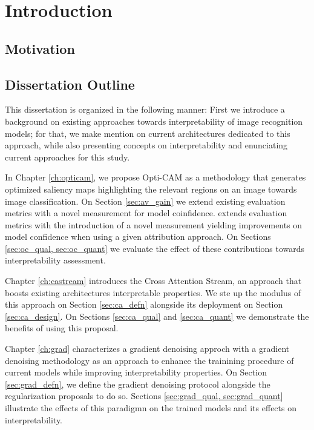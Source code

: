     \chapter*{Introduction}
    \chaptertoc{}

    \section*{Motivation}

    \section*{Dissertation Outline}
    This dissertation is organized in the following manner: First
    we introduce a background on existing approaches towards interpretability of image
    recognition models; for that, we make mention on current architectures dedicated 
    to this approach, while also presenting concepts on interpretability and enunciating 
    current approaches for this study. 

    In Chapter \ref{ch:opticam}, we propose Opti-CAM as a methodology that generates 
    optimized saliency maps highlighting the relevant regions on an image towards image
    classification. On Section \ref{sec:av_gain} we extend existing evaluation metrics 
    with a novel measurement for model coinfidence. extends evaluation metrics with the 
    introduction of a novel measurement yielding improvements on model confidence 
    when using a given attribution approach. On Sections \ref{sec:oc_qual, sec:oc_quant} 
    we evaluate the effect of these contributions towards interpretability assessment.
    
    Chapter \ref{ch:castream} introduces the Cross Attention Stream, an approach that boosts
     existing architectures interpretable properties. We ste up the modulus of this approach 
    on Section \ref{sec:ca_defn} alongside its deployment on Section \ref{sec:ca_design}. 
    On Sections \ref{sec:ca_qual} and \ref{sec:ca_quant} we demonstrate the benefits 
    of using this proposal.
    
    Chapter \ref{ch:grad} characterizes a gradient denoising approch with a gradient denoising
     methodology as an approach to enhance the trainining procedure of current
    models while improving interpretability properties. On Section \ref{sec:grad_defn}, 
    we define the gradient denoising protocol alongside the regularization proposals to do so.
    Sections \ref{sec:grad_qual, sec:grad_quant} illustrate the effects of this paradigmn
    on the trained models and its effects on interpretability.
    
